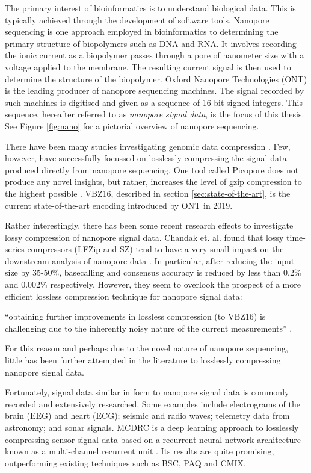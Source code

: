 The primary interest of bioinformatics is to understand biological data. This is typically achieved through the development of software tools. Nanopore sequencing is one approach employed in bioinformatics to determining the primary structure of biopolymers such as DNA and RNA. It involves recording the ionic current as a biopolymer passes through a pore of nanometer size with a voltage applied to the membrane. The resulting current signal is then used to determine the structure of the biopolymer. Oxford Nanopore Technologies (ONT) is the leading producer of nanopore sequencing machines. The signal recorded by such machines is digitised and given as a sequence of 16-bit signed integers. This sequence, hereafter referred to as \textit{nanopore signal data}, is the focus of this thesis. See Figure \ref{fig:nano} for a pictorial overview of nanopore sequencing.



There have been many studies investigating genomic data compression \cite{genomic-comp}. Few, however, have successfully focussed on losslessly compressing the signal data produced directly from nanopore sequencing. One tool called Picopore does not produce any novel insights, but rather, increases the level of gzip compression to the highest possible \cite{picopore}. VBZ16, described in section \ref{sec:state-of-the-art}, is the current state-of-the-art encoding introduced by ONT in 2019.

Rather interestingly, there has been some recent research effects to investigate lossy compression of nanopore signal data. Chandak et. al. found that lossy time-series compressors (LFZip and SZ) tend to have a very small impact on the downstream analysis of nanopore data \cite{lossy-nano, lfzip}. In particular, after reducing the input size by 35-50\%, basecalling and consensus accuracy is reduced by less than 0.2\% and 0.002\% respectively. However, they seem to overlook the prospect of a more efficient lossless compression technique for nanopore signal data:
\begin{displayquote}
``obtaining further improvements in lossless compression (to VBZ16) is challenging due to the inherently noisy nature of the current measurements'' \cite{lossy-nano}.
\end{displayquote}
For this reason and perhaps due to the novel nature of nanopore sequencing, little has been further attempted in the literature to losslessly compressing nanopore signal data.

Fortunately, signal data similar in form to nanopore signal data is commonly recorded and extensively researched. Some examples include electrograms of the brain (EEG) and heart (ECG); seismic and radio waves; telemetry data from astronomy; and sonar signals. MCDRC is a deep learning approach to losslessly compressing sensor signal data based on a recurrent neural network architecture known as a multi-channel recurrent unit \cite{mcdrc}. Its results are quite promising, outperforming existing techniques such as BSC, PAQ and CMIX.
